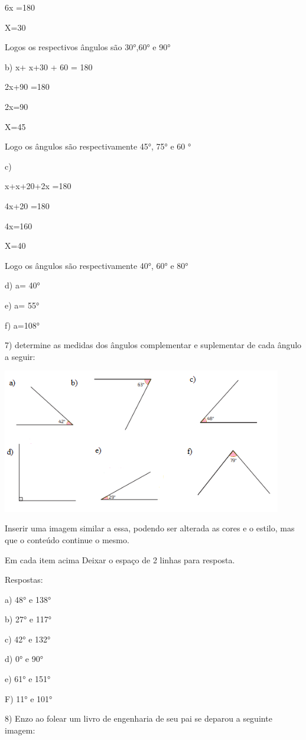 {6x =180

X=30

Logos os respectivos ângulos são 30°,60° e 90°

b) x+ x+30 + 60 = 180

2x+90 =180

2x=90

X=45

Logo os ângulos são respectivamente 45°, 75° e 60 °

c)

x+x+20+2x =180

4x+20 =180

4x=160

X=40

Logo os ângulos são respectivamente 40°, 60° e 80°

d) a= 40°

e) a= 55°

f) a=108°

7) determine as medidas dos ângulos complementar e suplementar de cada
ângulo a seguir:

\includegraphics[width=4.81667in,height=2.48373in]{./imgSAEB_8_MAT/media/image30.png}

Inserir uma imagem similar a essa, podendo ser alterada as cores e o
estilo, mas que o conteúdo continue o mesmo.

Em cada item acima Deixar o espaço de 2 linhas para resposta.

Respostas:

a) 48° e 138°

b) 27° e 117°

c) 42° e 132°

d) 0° e 90°

e) 61° e 151°

F) 11° e 101°

8) Enzo ao folear um livro de engenharia de seu pai se deparou a
seguinte imagem:

}
